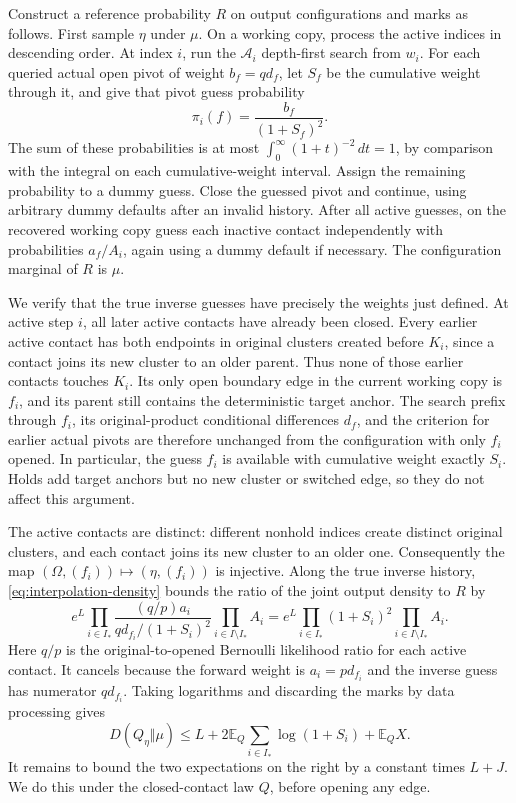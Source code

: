 \documentclass[11pt]{article}
\theoremstyle{definition}
\begin{document}
Construct a reference probability $R$ on output configurations and marks
as follows. First sample $\eta$ under $\mu$. On a working copy, process
the active indices in descending order. At index $i$, run the
$\mathcal A_i$ depth-first search from $w_i$. For each queried actual open
pivot of weight $b_f=qd_f$, let $S_f$ be the cumulative weight through it,
and give that pivot guess probability
\begin{equation}\label{eq:interpolation-inverse-guess}
 \pi_i(f)=\frac{b_f}{(1+S_f)^2}.
\end{equation}
The sum of these probabilities is at most
$\int_0^\infty(1+t)^{-2}\,dt=1$, by comparison with the integral on
each cumulative-weight interval. Assign the remaining probability to
a dummy guess. Close the guessed pivot and continue, using arbitrary
dummy defaults after an invalid history. After all active guesses, on
the recovered working copy guess each inactive contact independently
with probabilities $a_f/A_i$, again using a dummy default if necessary.
The configuration marginal of $R$ is $\mu$.

We verify that the true inverse guesses have precisely the weights just
defined. At active step $i$, all later active contacts have already been
closed. Every earlier active contact has both endpoints in original
clusters created before $K_i$, since a contact joins its new cluster to
an older parent. Thus none of those earlier contacts touches $K_i$.
Its only open boundary edge in the current working copy is $f_i$, and
its parent still contains the deterministic target anchor. The search
prefix through $f_i$, its original-product conditional differences
$d_f$, and the criterion for earlier actual pivots are therefore unchanged
from the configuration with only $f_i$ opened. In particular, the guess
$f_i$ is available with cumulative weight exactly $S_i$. Holds add target
anchors but no new cluster or switched edge, so they do not affect this
argument.

The active contacts are distinct: different nonhold indices create
distinct original clusters, and each contact joins its new cluster to
an older one. Consequently the map
$(\Omega,(f_i))\mapsto(\eta,(f_i))$ is injective. Along the true inverse
history, \eqref{eq:interpolation-density} bounds the ratio of the joint
output density to $R$ by
\[
 e^L\prod_{i\in I_*}
 \frac{(q/p)a_i}{qd_{f_i}/(1+S_i)^2}
 \prod_{i\in I\setminus I_*}A_i
 =e^L\prod_{i\in I_*}(1+S_i)^2
       \prod_{i\in I\setminus I_*}A_i.
\]
Here $q/p$ is the original-to-opened Bernoulli likelihood ratio for each
active contact. It cancels because the forward weight is $a_i=pd_{f_i}$
and the inverse guess has numerator $qd_{f_i}$.
Taking logarithms and discarding the marks by data processing gives
\begin{equation}\label{eq:interpolation-cost-to-bound}
 D(Q_\eta\Vert\mu)
 \le L+2\mathbb E_Q\sum_{i\in I_*}\log(1+S_i)+\mathbb E_Q X.
\end{equation}
It remains to bound the two expectations on the right by a constant
times $L+J$. We do this under the closed-contact law $Q$, before opening
any edge.
\end{document}
